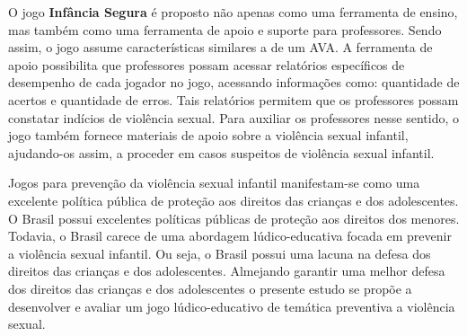 O jogo \textbf{Infância Segura} é proposto não apenas como uma ferramenta de ensino, mas também como uma ferramenta de apoio e suporte para professores. Sendo assim, o jogo assume características similares a de um \ac{AVA}. A ferramenta de apoio possibilita que professores possam acessar relatórios específicos de desempenho de cada jogador no jogo, acessando informações como: quantidade de acertos e quantidade de erros. Tais relatórios permitem que os professores possam constatar indícios de violência sexual. Para auxiliar os professores nesse sentido, o jogo também fornece materiais de apoio sobre a violência sexual infantil, ajudando-os assim, a proceder em casos suspeitos de violência sexual infantil.


Jogos para prevenção da violência sexual infantil manifestam-se como uma excelente política pública de proteção aos direitos das crianças e dos adolescentes. O Brasil possui excelentes políticas públicas de proteção aos direitos dos menores. Todavia, o Brasil carece de uma abordagem lúdico-educativa focada em prevenir a violência sexual infantil. Ou seja, o Brasil possui uma lacuna na defesa dos direitos das crianças e dos adolescentes. Almejando garantir uma melhor defesa dos direitos das crianças e dos adolescentes o presente estudo se propõe a desenvolver e avaliar um jogo lúdico-educativo de temática preventiva a violência sexual. 

